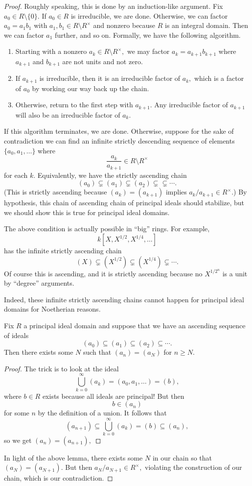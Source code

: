 \begin{proof}
	Roughly speaking, this is done by an induction-like argument. Fix $a_0\in R\setminus\{0\}.$ If $a_0\in R$ is irreducible, we are done. Otherwise, we can factor $a_0=a_1b_1$ with $a_1,b_1\in R\setminus R^\times$ and nonzero because $R$ is an integral domain. Then we can factor $a_1$ further, and so on. Formally, we have the following algorithm.
	\begin{enumerate}
		\item Starting with a nonzero $a_k\in R\setminus R^\times,$ we may factor $a_k=a_{k+1}b_{k+1}$ where $a_{k+1}$ and $b_{k+1}$ are not units and not zero.
		\item If $a_{k+1}$ is irreducible, then it is an irreducible factor of $a_k,$ which is a factor of $a_0$ by working our way back up the chain.
		\item Otherwise, return to the first step with $a_{k+1}.$ Any irreducible factor of $a_{k+1}$ will also be an irreducible factor of $a_k.$
	\end{enumerate}

	If this algorithm terminates, we are done. Otherwise, suppose for the sake of contradiction we can find an infinite strictly descending sequence of elements $\{a_0,a_1,\ldots\}$ where
	\[\frac{a_k}{a_{k+1}}\in R\setminus R^\times\]
	for each $k.$ Equivalently, we have the strictly ascending chain
	\[(a_0)\subsetneq(a_1)\subsetneq(a_2)\subsetneq\subsetneq\cdots.\]
	(This is strictly ascending because $(a_k)=(a_{k+1})$ implies $a_k/a_{k+1}\in R^\times.$) By hypothesis, this chain of ascending chain of principal ideals should stabilize, but we should show this is true for principal ideal domains.
	\begin{remark}
		The above condition is actually possible in ``big'' rings. For example,
		\[k\left[X,X^{1/2},X^{1/4},\ldots\right]\]
		has the infinite strictly ascending chain
		\[(X)\subsetneq\left(X^{1/2}\right)\subsetneq\left(X^{1/4}\right)\subsetneq\cdots.\]
		Of course this is ascending, and it is strictly ascending because no $X^{1/2^n}$ is a unit by ``degree'' arguments.
	\end{remark}
	Indeed, these infinite strictly ascending chains cannot happen for principal ideal domains for Noetherian reasons.
	\begin{lemma}
		Fix $R$ a principal ideal domain and suppose that we have an ascending sequence of ideals
		\[(a_0)\subseteq(a_1)\subseteq(a_2)\subseteq\cdots.\]
		Then there exists some $N$ such that $(a_n)=(a_N)$ for $n\ge N.$
	\end{lemma}
	\begin{proof}
		The trick is to look at the ideal
		\[\bigcup_{k=0}^\infty(a_k)=(a_0,a_1,\ldots)=(b),\]
		where $b\in R$ exists because all ideals are principal! But then
		\[b\in (a_n)\]
		for some $n$ by the definition of a union. It follows that
		\[(a_{n+1})\subseteq\bigcup_{k=0}^\infty(a_k)=(b)\subseteq(a_n),\]
		so we get $(a_n)=(a_{n+1}),$ 
	\end{proof}
	In light of the above lemma, there exists some $N$ in our chain so that $(a_N)=(a_{N+1}).$ But then $a_N/a_{N+1}\in R^\times,$ violating the construction of our chain, which is our contradiction.
\end{proof}
